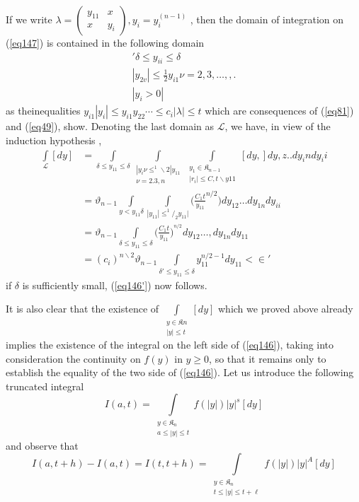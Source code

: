 If we write $\lambda = \left (\begin{smallmatrix} y_{11} & x \\ x &
  y_i \end{smallmatrix} \right ) , y_i = y_i^{(n-1)}$ ,
then the domain of integration on (\ref{eq147}) is contained in the
following domain  
\begin{gather*}'
\delta \leq y_{ii} \leq \delta \\
| y_{2 v}| \leq \frac{1}{2} y_{i1}\nu = 2, 3 , \ldots ,,.\\
|y_i > 0|
\end{gather*}
as the\pageoriginale  inequalities $y_{i1} |y_i| \leq y_{i1} y_{22}
\cdots \leq 
c_i |\lambda| \leq t$ which are consequences of (\ref{eq81}) and (\ref{eq49}),
show. Denoting the last domain as $\mathscr{L}$, we have, in view of
the induction hypothesis ,  
\begin{align*}
\int\limits_{ \mathscr{L}} [dy] & = \int\limits_{ \delta \leq y _{11}
  \leq \delta} \int\limits_{\substack{ | y_i \nu \leq ^1 \backslash 2|
    y_{11}\\ \nu = 2. 3 ,  n}} \int\limits_{\substack{ y_1 \in
    \mathfrak{K}_{n-1}\\ |r_i| \leq C, t \backslash y{11}}} [dy,] dy ,z
.. dy_in dy_ii\\ 
& = \vartheta_{n-1} \int\limits_{y < y_{11} \delta }
\int\limits_{|y_11| \leq ^1 / _2  y _{11}|} \bigg ( \frac{C_1
  t}{y_11}^{n/2}  \bigg)  dy_{12} \ldots dy_{1n} dy_{ii}\\ 
&= \vartheta _{n - 1} \int\limits_{\delta \leq y_{11} \leq \delta}
\bigg( \frac{C_1 t}{y_11}  \bigg)^{^{n/2}}  dy_{12} \ldots , dy_{1n}
dy_{11}\\ 
& = (c_i)^{n\backslash 2} \vartheta_{n-1} \int\limits_{ \delta ' \leq
  y_{11} \leq \delta } y_{11}  ^{n/ {2}-1} d y_{11} < \in  
'\end{align*} 
if $\delta$ is sufficiently small,  (\ref{eq146'}) now follows. 

It is also clear that the existence of $\int\limits_{\substack{ y
    \in \mathfrak{K} n \\ |y| \leq t}} [dy]$ which we proved above
already implies the existence of the integral on the left side of
(\ref{eq146}), taking into consideration the continuity on $f(y)$ in $y \geq
0$, so that it remains only to establish the equality of the two
side of (\ref{eq146}). Let us introduce the following truncated integral  
$$
I (a, t ) = \int\limits_{\substack{ y \in \mathfrak{K}_n \\ a \leq
    |y| \leq t}} f (|y|)| y |^s [dy] 
$$ 
and observe that 
$$
I (a, t + h) - I (a, t) = I (t, t + h) = \int\limits_{\substack{
    y \in \mathfrak{K}_n \\ t \leq | y | \leq t + \ell}} f (
|y|) | y |^A [dy] 
$$

